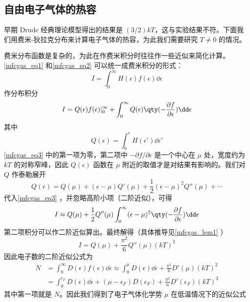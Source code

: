 \subsection{自由电子气体的热容}
早期 Drude 经典理论模型得出的结果是 $(3/2)k T$，这与实验结果不符。下面我们用费米-狄拉克分布来计算电子气体的热容，为此我们需要研究 $T\neq 0$ 的情况。

费米分布函数是复杂的，为此在作费米积分时往往作一些近似来简化计算。\autoref{mfcgas_eq1} 和\autoref{mfcgas_eq2} 可以统一成费米积分的形式：
\begin{equation}
I=\int_0^\infty H(\epsilon)f(\epsilon)\dd\epsilon
\end{equation}
作分布积分
\begin{equation}\label{mfcgas_eq3}
I=Q(\epsilon)f(\epsilon)|_0^\infty + \int_0^\infty Q(\epsilon)\qty(-\frac{\partial f}{\partial\epsilon})\dd \epsilon
\end{equation}
其中
\begin{equation}
Q(\epsilon)=\int_0^\epsilon H(\epsilon')\dd\epsilon'
\end{equation}
\autoref{mfcgas_eq3} 中的第一项为零，第二项中 $-\partial f/\partial \epsilon$ 是一个中心在 $\mu$ 处，宽度约为 $kT$ 的对称窄峰，因此 $Q(\epsilon)$ 函数在 $\mu$ 附近的取值才是对结果有影响的。我们对 $Q$ 作泰勒展开
\begin{equation}
Q(\epsilon)=Q(\mu)+(\epsilon-\mu)Q'(\mu)+\frac{1}{2}(\epsilon-\mu)^2 Q''(\mu)+\cdots
\end{equation}
代入\autoref{mfcgas_eq3} ，并忽略高阶小项（二阶近似），可得
\begin{equation}
I\approx Q(\mu)+\frac{1}{2}Q''(\mu)\int_0^\infty (\epsilon-\mu)^2 \qty(-\frac{\partial f}{\partial \epsilon})\dd\epsilon
\end{equation}
第二项积分可以作二阶近似算出。最终解得（具体推导见\autoref{mfcgas_lem1} ）
\begin{equation}
I=Q(\mu)+\frac{\pi^2}{6}Q''(\mu)(k T)^2
\end{equation}
因此电子数的二阶近似公式为
\begin{equation}
\begin{aligned}
N&=\int_0^\infty D(\epsilon) f(\epsilon) \dd\epsilon \approx 
\int_0^\mu D(\epsilon) \dd \epsilon + \frac{\pi^2}{6}D'(\mu)(kT)^2\\
&=\int_0^{\epsilon_F} D(\epsilon)\dd\epsilon+(\mu-\epsilon_F) D(\epsilon_F) + \frac{\pi^2}{6}D'(\epsilon_F)(kT)^2
\end{aligned}
\end{equation}
其中第一项就是 $N$。因此我们得到了电子气体化学势 $\mu$ 在低温情况下的近似公式

